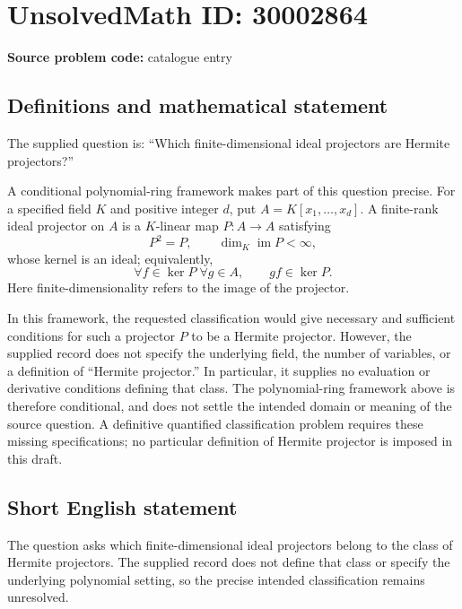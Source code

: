 \documentclass[11pt]{article}
\begin{document}
\section*{UnsolvedMath ID: 30002864}
\textbf{Source problem code:} catalogue entry
\subsection{Definitions and mathematical statement}
The supplied question is: ``Which finite-dimensional ideal projectors are Hermite projectors?''

A conditional polynomial-ring framework makes part of this question precise. For a specified field \(K\) and positive integer \(d\), put \(A=K[x_1,\ldots,x_d]\). A finite-rank ideal projector on \(A\) is a \(K\)-linear map \(P:A\to A\) satisfying
\[
P^2=P,\qquad \dim_K\operatorname{im}P<\infty,
\]
whose kernel is an ideal; equivalently,
\[
\forall f\in\ker P\;\forall g\in A,\qquad gf\in\ker P.
\]
Here finite-dimensionality refers to the image of the projector.

In this framework, the requested classification would give necessary and sufficient conditions for such a projector \(P\) to be a Hermite projector. However, the supplied record does not specify the underlying field, the number of variables, or a definition of ``Hermite projector.'' In particular, it supplies no evaluation or derivative conditions defining that class. The polynomial-ring framework above is therefore conditional, and does not settle the intended domain or meaning of the source question. A definitive quantified classification problem requires these missing specifications; no particular definition of Hermite projector is imposed in this draft.
\subsection{Short English statement}
The question asks which finite-dimensional ideal projectors belong to the class of Hermite projectors. The supplied record does not define that class or specify the underlying polynomial setting, so the precise intended classification remains unresolved.
\end{document}
